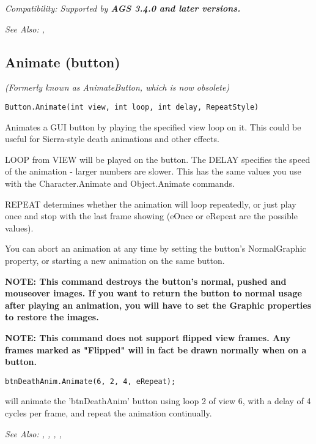 \it{Compatibility:} Supported by \bf{AGS 3.4.0} and later versions.

\it{See Also:} ,


\subsection{Animate (button)}\label{Button.Animate}%

\it{(Formerly known as AnimateButton, which is now obsolete)}

\begin{verbatim}
Button.Animate(int view, int loop, int delay, RepeatStyle)
\end{verbatim}
Animates a GUI button by playing the specified view loop on it. This could be
useful for Sierra-style death animations and other effects.

LOOP from VIEW will be played on the button. The DELAY specifies the speed of
the animation - larger numbers are slower. This has the same values you use
with the Character.Animate and Object.Animate commands.

REPEAT determines whether the animation will loop repeatedly, or just play once and stop
with the last frame showing (eOnce or eRepeat are the possible values).

You can abort an animation at any time by setting the button's NormalGraphic property, or
starting a new animation on the same button.

\bf{NOTE:} This command destroys the button's normal, pushed and mouseover images. If you
want to return the button to normal usage after playing an animation, you will have to set
the Graphic properties to restore the images.

\bf{NOTE:} This command does not support flipped view frames. Any frames marked as "Flipped"
will in fact be drawn normally when on a button.

\begin{verbatim}
btnDeathAnim.Animate(6, 2, 4, eRepeat);
\end{verbatim}
will animate the 'btnDeathAnim' button using loop 2 of view 6, with a delay of 4
cycles per frame, and repeat the animation continually.

\it{See Also:} ,
,
,
,


